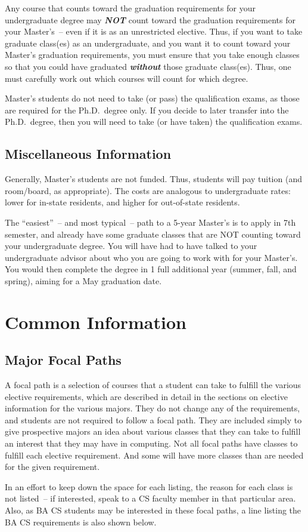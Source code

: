 \documentclass[10pt,letter]{book}
\newcommand{\mychapter}[2]{\chapter{#1}\renewcommand{\leftmark}{\textsc{#2}}}
\newcommand{\mysection}[1]{\section{#1}\renewcommand{\rightmark}{#1}}
\begin{document}
Any course that counts toward the graduation requirements for your
undergraduate degree may {\em\bf NOT} count toward the graduation
requirements for your Master's~-- even if it is as an unrestricted
elective.  Thus, if you want to take graduate class(es) as an
undergraduate, and you want it to count toward your Master's
graduation requirements, you must ensure that you take enough classes
so that you could have graduated {\em\bf without} those graduate
class(es).  Thus, one must carefully work out which courses will count
for which degree.

Master's students do not need to take (or pass) the qualification
exams, as those are required for the Ph.D.\ degree only.  If you
decide to later transfer into the Ph.D.\ degree, then you will need to
take (or have taken) the qualification exams.

\mysection{Miscellaneous Information}

Generally, Master's students are not funded.  Thus, students will pay
tuition (and room/board, as appropriate).  The costs are analogous to
undergraduate rates: lower for in-state residents, and higher for
out-of-state residents.

The ``easiest''~-- and most typical~-- path to a 5-year Master's is to
apply in 7th semester, and already have some graduate classes that are
NOT counting toward your undergraduate degree.  You will have had to
have talked to your undergraduate advisor about who you are going to
work with for your Master's.  You would then complete the degree in 1
full additional year (summer, fall, and spring), aiming for a May
graduation date.


\clearpage
\mychapter{Common Information}{Common Information}

\mysection{Major Focal Paths}

A focal path is a selection of courses that a student can take to
fulfill the various elective requirements, which are described in
detail in the sections on elective information for the various
majors. They do not change any of the requirements, and students are
not required to follow a focal path. They are included simply to give
prospective majors an idea about various classes that they can take to
fulfill an interest that they may have in computing. Not all focal
paths have classes to fulfill each elective requirement. And some will
have more classes than are needed for the given requirement.

In an effort to keep down the space for each listing, the reason for
each class is not listed~-- if interested, speak to a CS faculty
member in that particular area. Also, as BA CS students may be
interested in these focal paths, a line listing the BA CS requirements
is also shown below.
\end{document}
